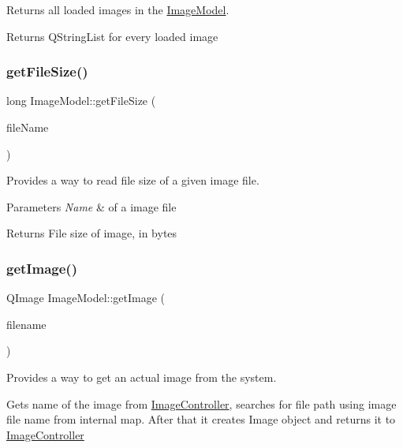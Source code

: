 Returns all loaded images in the \hyperlink{classImageModel}{Image\+Model}. 

\begin{DoxyReturn}{Returns}
Q\+String\+List for every loaded image 
\end{DoxyReturn}
\mbox{\label{classImageModel_a38c8d5868b7a8f8acca235c4383c5102}} 
\subsubsection{\texorpdfstring{get\+File\+Size()}{getFileSize()}}
{\footnotesize\ttfamily long Image\+Model\+::get\+File\+Size (\begin{DoxyParamCaption}\item[{const Q\+String \&}]{file\+Name }\end{DoxyParamCaption})}



Provides a way to read file size of a given image file. 


\begin{DoxyParams}{Parameters}
{\em Name} & of a image file \\
\hline
\end{DoxyParams}
\begin{DoxyReturn}{Returns}
File size of image, in bytes 
\end{DoxyReturn}
\mbox{\label{classImageModel_ac0021794e5694bd76c76349b8af96428}} 
\subsubsection{\texorpdfstring{get\+Image()}{getImage()}}
{\footnotesize\ttfamily Q\+Image Image\+Model\+::get\+Image (\begin{DoxyParamCaption}\item[{const Q\+String \&}]{filename }\end{DoxyParamCaption})}



Provides a way to get an actual image from the system. 

Gets name of the image from \hyperlink{classImageController}{Image\+Controller}, searches for file path using image file name from internal map. After that it creates Image object and returns it to \hyperlink{classImageController}{Image\+Controller}


